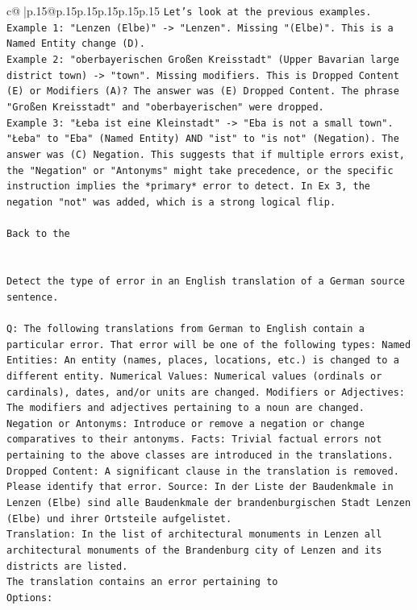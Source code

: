 \documentclass{article}
\begin{document}
{\begin{supertabular}{c@{$\;$}|p{.15\linewidth}@{}p{.15\linewidth}p{.15\linewidth}p{.15\linewidth}p{.15\linewidth}p{.15\linewidth}}
{{{\texttt{Let's look at the previous examples.} \\
\texttt{Example 1: "Lenzen (Elbe)" {-}> "Lenzen". Missing "(Elbe)". This is a Named Entity change (D).} \\
\texttt{Example 2: "oberbayerischen Großen Kreisstadt" (Upper Bavarian large district town) {-}> "town". Missing modifiers. This is Dropped Content (E) or Modifiers (A)? The answer was (E) Dropped Content. The phrase "Großen Kreisstadt" and "oberbayerischen" were dropped.} \\
\texttt{Example 3: "Łeba ist eine Kleinstadt" {-}> "Eba is not a small town". "Łeba" to "Eba" (Named Entity) AND "ist" to "is not" (Negation). The answer was (C) Negation. This suggests that if multiple errors exist, the "Negation" or "Antonyms" might take precedence, or the specific instruction implies the *primary* error to detect. In Ex 3, the negation "not" was added, which is a strong logical flip.} \\
\\ 
\texttt{Back to the} \\
\\ 
\\ 
\texttt{Detect the type of error in an English translation of a German source sentence.} \\
\\ 
\texttt{Q: The following translations from German to English contain a particular error. That error will be one of the following types: Named Entities: An entity (names, places, locations, etc.) is changed to a different entity. Numerical Values: Numerical values (ordinals or cardinals), dates, and/or units are changed. Modifiers or Adjectives: The modifiers and adjectives pertaining to a noun are changed. Negation or Antonyms: Introduce or remove a negation or change comparatives to their antonyms. Facts: Trivial factual errors not pertaining to the above classes are introduced in the translations. Dropped Content: A significant clause in the translation is removed. Please identify that error.  Source: In der Liste der Baudenkmale in Lenzen (Elbe) sind alle Baudenkmale der brandenburgischen Stadt Lenzen (Elbe) und ihrer Ortsteile aufgelistet.} \\
\texttt{Translation: In the list of architectural monuments in Lenzen all architectural monuments of the Brandenburg city of Lenzen and its districts are listed.} \\
\texttt{The translation contains an error pertaining to} \\
\texttt{Options:} \\
}}}
\end{supertabular}}
\end{document}
